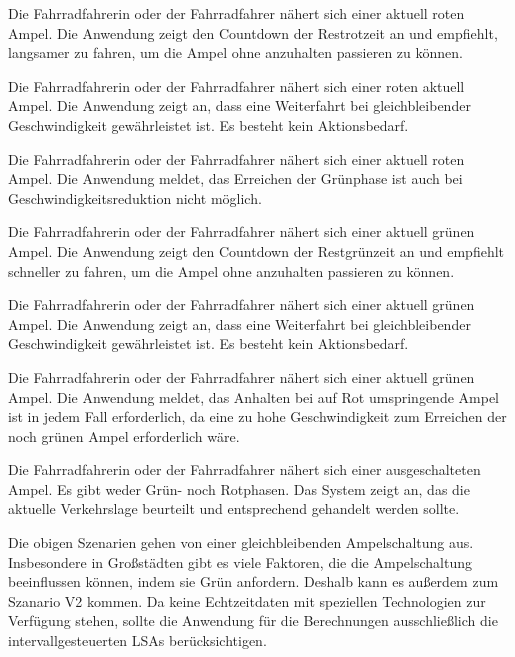 \begin{description}[leftmargin=0.7cm,style=nextline]
\clearpage
\item[Szenario R1:] 
Die Fahrradfahrerin oder der Fahrradfahrer nähert sich einer aktuell roten Ampel. Die Anwendung zeigt den Countdown der Restrotzeit an und empfiehlt, langsamer zu fahren, um die Ampel ohne anzuhalten passieren zu können.  \\
\item[Szenario R2:] 
Die Fahrradfahrerin oder der Fahrradfahrer nähert sich einer roten aktuell Ampel. Die Anwendung zeigt an, dass eine Weiterfahrt bei gleichbleibender Geschwindigkeit gewährleistet ist. Es besteht kein Aktionsbedarf. \\
\item[Szenario R3:] 
Die Fahrradfahrerin oder der Fahrradfahrer nähert sich einer aktuell roten Ampel. Die Anwendung meldet, das Erreichen der Grünphase ist auch bei Geschwindigkeitsreduktion nicht möglich.\\%
\item[Szenario G1:] 
Die Fahrradfahrerin oder der Fahrradfahrer nähert sich einer aktuell grünen Ampel. Die Anwendung zeigt den Countdown der Restgrünzeit an und empfiehlt schneller zu fahren, um die Ampel ohne anzuhalten passieren zu können.\\
\item[Szenario G2:] 
Die Fahrradfahrerin oder der Fahrradfahrer nähert sich einer aktuell grünen Ampel. Die Anwendung zeigt an, dass eine Weiterfahrt bei gleichbleibender Geschwindigkeit gewährleistet ist. Es besteht kein Aktionsbedarf.\\ 
\item[Szenario G3:] 
Die Fahrradfahrerin oder der Fahrradfahrer nähert sich einer aktuell grünen Ampel. Die Anwendung meldet, das Anhalten bei auf Rot umspringende Ampel ist in jedem Fall erforderlich, da eine zu hohe Geschwindigkeit zum Erreichen der noch grünen Ampel erforderlich wäre.\\
\item[Szenario V1:] 
Die Fahrradfahrerin oder der Fahrradfahrer nähert sich einer ausgeschalteten Ampel. Es gibt weder Grün- noch Rotphasen. Das System zeigt an, das die aktuelle Verkehrslage beurteilt und entsprechend gehandelt werden sollte.\\ 
\end{description}
\clearpage
\centerline{\grayRule}
Die obigen Szenarien gehen von einer gleichbleibenden Ampelschaltung aus. Insbesondere in Großstädten gibt es viele Faktoren, die die Ampelschaltung beeinflussen können, indem sie Grün anfordern. Deshalb kann es außerdem zum Szanario V2 kommen. Da keine Echtzeitdaten mit speziellen Technologien zur Verfügung stehen, sollte die Anwendung für die Berechnungen ausschließlich die intervallgesteuerten \glspl{LSA} berücksichtigen.\\
